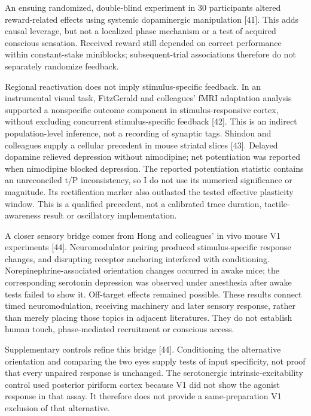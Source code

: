\documentclass[
  american,
  11pt,
  letterpaper,
]{article}
\begin{document}
An ensuing randomized, double-blind experiment in 30 participants altered reward-related effects using systemic dopaminergic manipulation {[}41{]}. This adds causal leverage, but not a localized phase mechanism or a test of acquired conscious sensation. Received reward still depended on correct performance within constant-stake miniblocks; subsequent-trial associations therefore do not separately randomize feedback.

Regional reactivation does not imply stimulus-specific feedback. In an instrumental visual task, FitzGerald and colleagues' fMRI adaptation analysis supported a nonspecific outcome component in stimulus-responsive cortex, without excluding concurrent stimulus-specific feedback {[}42{]}. This is an indirect population-level inference, not a recording of synaptic tags. Shindou and colleagues supply a cellular precedent in mouse striatal slices {[}43{]}. Delayed dopamine relieved depression without nimodipine; net potentiation was reported when nimodipine blocked depression. The reported potentiation statistic contains an unreconciled t/P inconsistency, so I do not use its numerical significance or magnitude. Its rectification marker also outlasted the tested effective plasticity window. This is a qualified precedent, not a calibrated trace duration, tactile-awareness result or oscillatory implementation.

A closer sensory bridge comes from Hong and colleagues' in vivo mouse V1 experiments {[}44{]}. Neuromodulator pairing produced stimulus-specific response changes, and disrupting receptor anchoring interfered with conditioning. Norepinephrine-associated orientation changes occurred in awake mice; the corresponding serotonin depression was observed under anesthesia after awake tests failed to show it. Off-target effects remained possible. These results connect timed neuromodulation, receiving machinery and later sensory response, rather than merely placing those topics in adjacent literatures. They do not establish human touch, phase-mediated recruitment or conscious access.

Supplementary controls refine this bridge {[}44{]}. Conditioning the alternative orientation and comparing the two eyes supply tests of input specificity, not proof that every unpaired response is unchanged. The serotonergic intrinsic-excitability control used posterior piriform cortex because V1 did not show the agonist response in that assay. It therefore does not provide a same-preparation V1 exclusion of that alternative.
\end{document}
